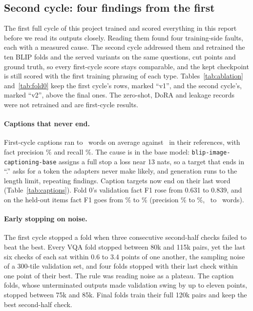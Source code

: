 \documentclass[10pt,twocolumn]{article}
\begin{document}
\subsection{Second cycle: four findings from the first}\label{sec:cycles}
The first full cycle of this project trained and scored everything in this report before we read its outputs closely. Reading them found four training-side faults, each with a measured cause. The second cycle addressed them and retrained the ten BLIP folds and the served variants on the same questions, cut points and ground truth, so every first-cycle score stays comparable, and the kept checkpoint is still scored with the first training phrasing of each type. Tables~\ref{tab:ablation} and~\ref{tab:fold0} keep the first cycle's rows, marked ``v1'', and the second cycle's, marked ``v2'', above the final ones. The zero-shot, DoRA and leakage records were not retrained and are first-cycle results.

\paragraph{Captions that never end.} First-cycle captions ran to \voneFoldWords\ words on average against \ in their references, with fact precision \voneFoldPrecision\% and recall \voneFoldRecall\%. The cause is in the base model: \texttt{blip-image-captioning-base} assigns a full stop a loss near 13 nats, so a target that ends in ``.'' asks for a token the adapters never make likely, and generation runs to the length limit, repeating findings. Caption targets now end on their last word (Table~\ref{tab:captions}). Fold 0's validation fact F1 rose from 0.631 to 0.839, and on the held-out items fact F1 goes from \voneFoldFactF\% to \blipFoldFactF\% (precision \voneFoldPrecision\% to \blipFoldPrecision\%, \voneFoldWords\ to \blipFoldWords\ words).
\begin{table}[t]\centering\footnotesize

\caption{Three fold-0 tiles, the lowest row id of each kind: the reference caption beside the first cycle's caption and the final one.}\label{tab:captions}
\end{table}

\paragraph{Early stopping on noise.} The first cycle stopped a fold when three consecutive second-half checks failed to beat the best. Every VQA fold stopped between 80k and 115k pairs, yet the last six checks of each sat within 0.6 to 3.4 points of one another, the sampling noise of a 300-tile validation set, and four folds stopped with their last check within one point of their best. The rule was reading noise as a plateau. The caption folds, whose unterminated outputs made validation swing by up to eleven points, stopped between 75k and 85k. Final folds train their full 120k pairs and keep the best second-half check.
\end{document}
